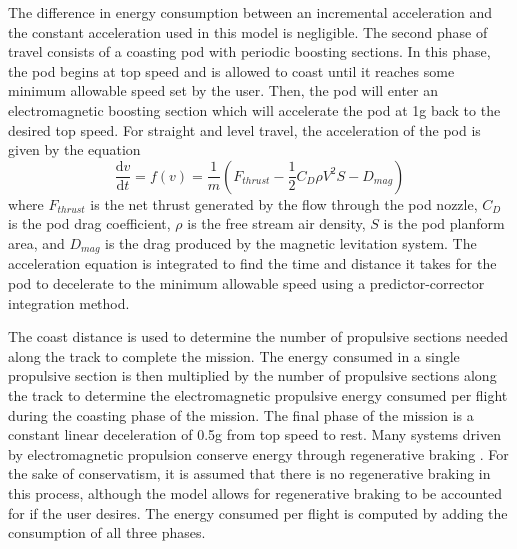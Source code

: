 	The difference in energy consumption between an incremental acceleration
	and the constant acceleration used in this model is negligible.
	The second phase of travel consists of a coasting pod with periodic boosting sections.
	In this phase, the pod begins at top speed and is allowed to coast until it
	reaches some minimum allowable speed set by the user.
	Then, the pod will enter an electromagnetic boosting section which will
	accelerate the pod at 1g back to the desired top speed.
	For straight and level travel, the acceleration of the pod is given by the equation
	\begin{equation}
		\label{eq:acceleration}
		\frac{\mathrm{d} v}{\mathrm{d} t} = f ( v  ) = \frac{1}{m} ( F_{thrust} - \frac{1}{2}C_{D}\rho V^{2}S - D_{mag})
	\end{equation}
	where $F_{thrust}$ is the net thrust generated by the flow through the pod
	nozzle, $C_D$ is the pod drag coefficient, $\rho$ is the free stream air
	density, $S$ is the pod planform area, and $D_{mag}$ is the drag produced
	by the magnetic levitation system. The acceleration equation is integrated
	to find the time and distance it takes for the pod to decelerate to the
	minimum allowable speed using a predictor-corrector integration method.

  The coast distance is used to determine the number of propulsive sections
	needed along the track to complete the mission. The energy consumed in a
	single propulsive section is then multiplied by the number of propulsive
	sections along the track to determine the electromagnetic propulsive energy
	consumed per flight during the coasting phase of the mission. The final
	phase of the mission is a constant linear deceleration of 0.5g from top
	speed to rest. Many systems driven by electromagnetic propulsion conserve
	energy through regenerative braking \cite{inductrack}. For the sake of
	conservatism, it is assumed that there is no regenerative braking in this
	process, although the model allows for regenerative braking to be
	accounted for if the user desires. The energy consumed per flight is
	computed by adding the consumption of all three phases.

